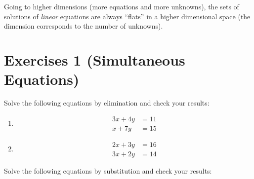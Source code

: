 \documentclass[
  12pt,
  oneside]{book}
\theoremstyle{definition}
\theoremstyle{definition}
\theoremstyle{definition}
\theoremstyle{definition}
\theoremstyle{remark}
\begin{document}
Going to higher dimensions (more equations and more unknowns), the sets of solutions of \emph{linear} equations are always ``flats'' in a higher dimensional space (the dimension corresponds to the number of unknowns).

\hypertarget{exercises-1-simultaneous-equations}{%
\chapter*{Exercises 1 (Simultaneous Equations)}\label{exercises-1-simultaneous-equations}}

Solve the following equations by elimination and check your results:

\begin{enumerate}
\def\labelenumi{\arabic{enumi}.}
\item
  \begin{align*}
  3x+4y &= 11\\
  x+7y  &= 15
  \end{align*}
\item
  \begin{align*}
  2x+3y &= 16\\
  3x+2y &= 14
  \end{align*}
\end{enumerate}

Solve the following equations by substitution and check your results:
\end{document}
